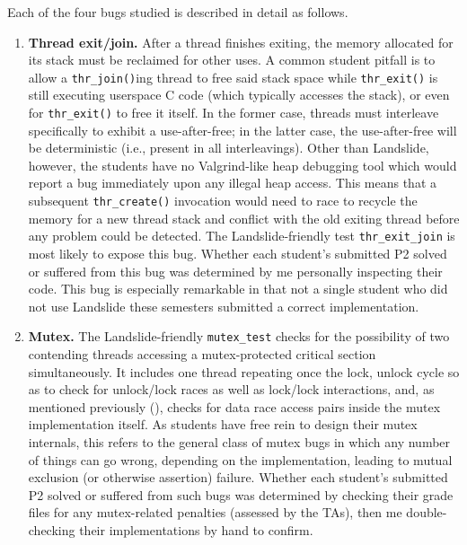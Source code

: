 Each of the four bugs studied is described in detail as follows.

\begin{enumerate}
\item
{\bf Thread exit/join.}
After a thread finishes exiting, the memory allocated for its stack must be reclaimed for other uses.
A common student pitfall is to allow a {\tt thr\_join()}ing thread to free said stack space
while {\tt thr\_exit()} is still executing userspace C code (which typically accesses the stack),
or even for {\tt thr\_exit()} to free it itself.
In the former case, threads must interleave specifically to exhibit a use-after-free;
in the latter case, the use-after-free will be deterministic (i.e., present in all interleavings).
Other than Landslide, however,
the students have no Valgrind-like heap debugging tool which would report a bug immediately upon any illegal heap access.
This means that a subsequent {\tt thr\_create()} invocation would need to race to recycle the memory for a new thread stack
and conflict with the old exiting thread
before any problem could be detected.
The Landslide-friendly test {\tt thr\_exit\_join} is most likely to expose this bug.
Whether each student's submitted P2 solved or suffered from this bug
was determined by me personally inspecting their code.
%
This bug is especially remarkable in that not a single student who did not use Landslide these semesters
submitted a correct implementation.

\item
{\bf Mutex.}
The Landslide-friendly {\tt mutex\_test} checks for the possibility of two contending threads
accessing a mutex-protected critical section simultaneously.
It includes one thread repeating once the lock, unlock cycle
so as to check for unlock/lock races as well as lock/lock interactions,
and, as mentioned previously (\sect{\ref{sec:education-pebbles-tests}}),
checks for data race access pairs inside the mutex implementation itself.
As students have free rein to design their mutex internals,
this refers to the general class of mutex bugs
in which any number of things can go wrong, depending on the implementation,
leading to mutual exclusion (or otherwise assertion) failure.
Whether each student's submitted P2 solved or suffered from such bugs
was determined by checking their grade files for any mutex-related penalties (assessed by the TAs),
then me double-checking their implementations by hand to confirm.


\end{enumerate}
